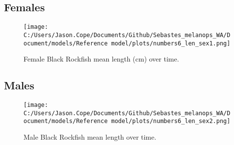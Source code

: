 \documentclass[11pt,
  english,
  letterpaper,
]{article}
\begin{document}
\hypertarget{females-1}{%
\subsection{Females}\label{females-1}}

\begin{figure}
\centering
\texttt{[image: C:/Users/Jason.Cope/Documents/Github/Sebastes\_melanops\_WA/Document/models/Reference model/plots/numbers6\_len\_sex1.png]}
\caption{Female Black Rockfish mean length (cm) over time.\label{fig:num_lts_females}}
\end{figure}

\clearpage

\hypertarget{males-1}{%
\subsection{Males}\label{males-1}}

\begin{figure}
\centering
\texttt{[image: C:/Users/Jason.Cope/Documents/Github/Sebastes\_melanops\_WA/Document/models/Reference model/plots/numbers6\_len\_sex2.png]}
\caption{Male Black Rockfish mean length over time.\label{fig:num_lts_males}}
\end{figure}

\clearpage
\end{document}
